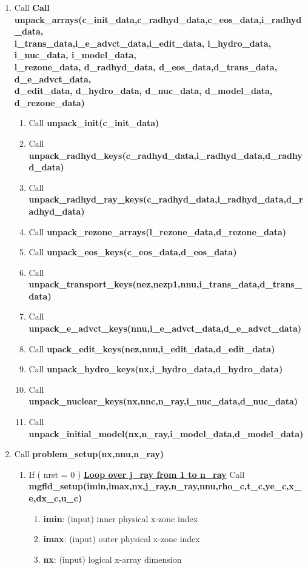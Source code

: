 \documentclass[11pt,doublespace]{article}
\begin{document}
\begin{itemize}
\begin{enumerate}
\begin{enumerate}
  \item Call {\bf Call unpack\_arrays(c\_init\_data,c\_radhyd\_data,c\_eos\_data,i\_radhyd\_data,\\
i\_trans\_data,i\_e\_advct\_data,i\_edit\_data, i\_hydro\_data, i\_nuc\_data, i\_model\_data,\\
l\_rezone\_data, d\_radhyd\_data, d\_eos\_data,d\_trans\_data, d\_e\_advct\_data,\\
d\_edit\_data, d\_hydro\_data, d\_nuc\_data, d\_model\_data, d\_rezone\_data)}
\begin{enumerate}
  \item Call {\bf unpack\_init(c\_init\_data)}
  \item Call {\bf unpack\_radhyd\_keys(c\_radhyd\_data,i\_radhyd\_data,d\_radhyd\_data)}
  \item Call {\bf unpack\_radhyd\_ray\_keys(c\_radhyd\_data,i\_radhyd\_data,d\_radhyd\_data)}
  \item Call {\bf unpack\_rezone\_arrays(l\_rezone\_data,d\_rezone\_data)}
  \item Call {\bf unpack\_eos\_keys(c\_eos\_data,d\_eos\_data)}
  \item Call {\bf unpack\_transport\_keys(nez,nezp1,nnu,i\_trans\_data,d\_trans\_data)}
  \item Call {\bf unpack\_e\_advct\_keys(nnu,i\_e\_advct\_data,d\_e\_advct\_data)}
  \item Call {\bf upack\_edit\_keys(nez,nnu,i\_edit\_data,d\_edit\_data)}
  \item Call {\bf unpack\_hydro\_keys(nx,i\_hydro\_data,d\_hydro\_data)}
  \item Call {\bf unpack\_nuclear\_keys(nx,nnc,n\_ray,i\_nuc\_data,d\_nuc\_data)}
  \item Call {\bf unpack\_initial\_model(nx,n\_ray,i\_model\_data,d\_model\_data)}
\end{enumerate}
  \item Call {\bf problem\_setup(nx,nnu,n\_ray)}
\begin{enumerate}
  \item If ( nrst = 0 ) {\bf {\underline{Loop over j\_ray from 1 to n\_ray}}} Call {\bf mgfld\_setup(imin,imax,nx,j\_ray,n\_ray,nnu,rho\_c,t\_c,ye\_c,x\_e,dx\_c,u\_c)}
\begin{enumerate}
  \item {\bf imin}: (input) inner physical x-zone index
  \item {\bf imax}: (input) outer physical x-zone index
  \item {\bf nx}: (input) logical x-array dimension

\end{enumerate}
\end{enumerate}
\end{enumerate}
\end{enumerate}
\end{itemize}
\end{document}
